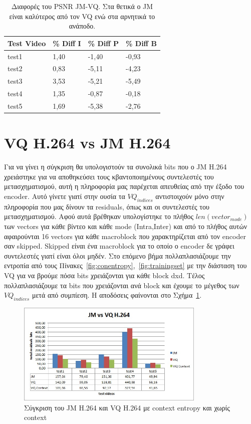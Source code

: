 \begin{table}[h!]
    \begin{center}
        \begin{tabular}{| l | l | l | l |}
        \hline
        Test Video & \% Diff I  & \% Diff P & \% Diff B   \\ \hline
        test1      & 1,40	    & -1,40	    & -0,93       \\ \hline
        test2      & 0,83	    & -5,11	    & -4,23       \\ \hline
        test3      & 3,53	    & -5,21	    & -5,49       \\ \hline
        test4      & 1,35	    & -0,87	    & -0,18       \\ \hline
        test5      & 1,69	    & -5,38	    & -2,76       \\ \hline
        \hline
        \end{tabular}
    \end{center}

    \caption{Διαφορές του PSNR JM-VQ. Στα θετικά ο JM είναι καλύτερος από τον VQ ενώ στα αρνητικά το ανάποδο.}
    \label{table:jmvqdiff}
\end{table}

\newpage
\section{VQ H.264 vs JM H.264}
\label{section:sect63}

\indent Για να γίνει η σύγκριση θα υπολογιστούν τα συνολικά bits που ο JM H.264 χρειάστηκε για να αποθηκεύσει τους κβαντοποιημένους συντελεστές του μετασχηματισμού, αυτή η πληροφορία μας παρέχεται απευθείας από την έξοδο του encoder. Αυτό γίνετε γιατί στην ουσία τα $VQ_{indices}$ αντιστοιχούν μόνο στην πληροφορία που μας δίνουν τα residuals, όπως και οι συντελεστές του μετασχηματισμού. Αφού αυτά βρέθηκαν υπολογίστηκε το πλήθος $len(vector_{mode})$ των vectors για κάθε βίντεο και κάθε mode (Intra,Inter) και από το πλήθος αυτών αφαιρούνται 16 vectors για κάθε macroblock που χαρακτηρίζεται από τον encoder σαν skipped. Skipped είναι ένα macroblock για το οποίο ο encoder δε γράφει συντελεστές γιατί είναι όλοι μηδέν. Στο επόμενο βήμα πολλαπλασιάζουμε την εντροπία από τους Πίνακες~\ref{fig:conentropy},~\ref{fig:trainingset} με την διάσταση του VQ για να βρούμε πόσα bits χρειάζονται για κάθε block dxd. Τέλος πολλαπλασιάζουμε τα bits που χρειάζονται ανά block και έχουμε το μέγεθος των $VQ_{indices}$ μετά από συμπίεση. Η αποδόσεις φαίνονται στο Σχήμα~\ref{fig:compare1}.

\begin{figure}[H]
    \centering
    \includegraphics[width=0.8\textwidth]{chapter6/compare1.jpg}
    \caption{Σύγκριση του JM H.264 και VQ H.264 με context entropy και χωρίς context}
    \label{fig:compare1}
\end{figure}